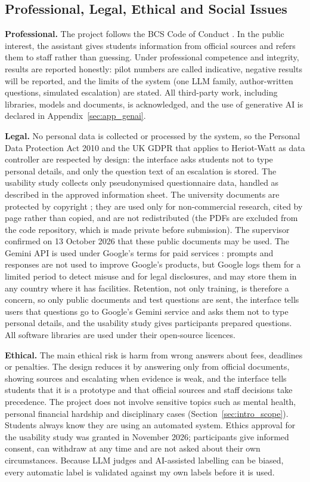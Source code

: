 \documentclass[12pt,nonacm,acmlarge,titlepage,screen]{acmart}
\begin{document}
\clearpage
\subsection{Professional, Legal, Ethical and Social Issues} \label{sec:app_ples}

\textbf{Professional.} The project follows the BCS Code of Conduct \cite{bcs2022code}. In the public interest, the assistant gives students information from official sources and refers them to staff rather than guessing. Under professional competence and integrity, results are reported honestly: pilot numbers are called indicative, negative results will be reported, and the limits of the system (one LLM family, author-written questions, simulated escalation) are stated. All third-party work, including libraries, models and documents, is acknowledged, and the use of generative AI is declared in Appendix~\ref{sec:app_genai}.

\textbf{Legal.} No personal data is collected or processed by the system, so the Personal Data Protection Act 2010 \cite{pdpa2010} and the UK GDPR that applies to Heriot-Watt as data controller are respected by design: the interface asks students not to type personal details, and only the question text of an escalation is stored. The usability study collects only pseudonymised questionnaire data, handled as described in the approved information sheet. The university documents are protected by copyright \cite{copyright1987}; they are used only for non-commercial research, cited by page rather than copied, and are not redistributed (the PDFs are excluded from the code repository, which is made private before submission). The supervisor confirmed on 13 October 2026 that these public documents may be used. The Gemini API is used under Google's terms for paid services \cite{google2026terms}: prompts and responses are not used to improve Google's products, but Google logs them for a limited period to detect misuse and for legal disclosures, and may store them in any country where it has facilities. Retention, not only training, is therefore a concern, so only public documents and test questions are sent, the interface tells users that questions go to Google's Gemini service and asks them not to type personal details, and the usability study gives participants prepared questions. All software libraries are used under their open-source licences.

\textbf{Ethical.} The main ethical risk is harm from wrong answers about fees, deadlines or penalties. The design reduces it by answering only from official documents, showing sources and escalating when evidence is weak, and the interface tells students that it is a prototype and that official sources and staff decisions take precedence. The project does not involve sensitive topics such as mental health, personal financial hardship and disciplinary cases (Section~\ref{sec:intro_scope}). Students always know they are using an automated system. Ethics approval for the usability study was granted in November 2026; participants give informed consent, can withdraw at any time and are not asked about their own circumstances. Because LLM judges and AI-assisted labelling can be biased, every automatic label is validated against my own labels before it is used.
\end{document}
